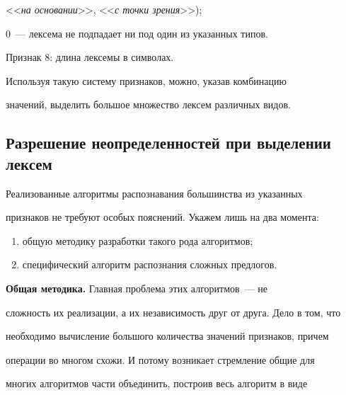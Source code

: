 <<\textit{на основании}>>, <<\textit{с точки зрения}>>);


   


   0~--- лексема не подпадает ни под один из указанных типов.


   


   \smallskip


   


   Признак 8: длина лексемы в символах.


   


     Используя такую систему признаков, можно, указав комбинацию 


значений, выделить большое множество лексем различных видов.





\subsection{Разрешение неопределенностей при выделении лексем}


   


   Реализованные алгоритмы распознавания большинства из указанных 


признаков не требуют особых пояснений. Укажем лишь на два момента:


   \begin{enumerate}[(1)]


   \item общую методику разработки такого рода алгоритмов;


   \item специфический алгоритм распознания сложных предлогов.


   \end{enumerate}


   


   \textbf{Общая методика.} Главная проблема этих алгоритмов~--- не 


сложность их реализации, а их независимость друг от друга. Дело в том, что 


необходимо вычисление большого количества значений признаков, причем 


операции во многом схожи. И потому возникает стремление общие для 


многих алгоритмов части объединить, построив весь алгоритм в виде 


